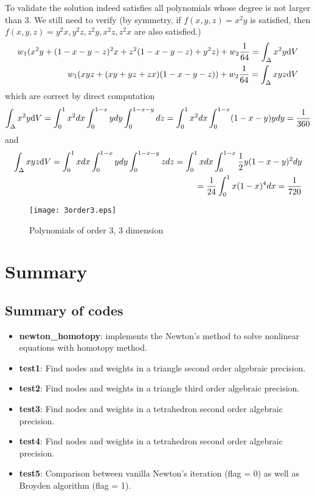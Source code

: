 \documentclass[conference,onecolumn, 12pt]{IEEEtran}
\begin{document}
To validate the solution indeed satisfies all polynomials whose degree is not larger than 3. We still need to verify (by symmetry, if $f(x,y,z)=x^2y$ is satisfied, then $f(x,y,z)=y^2x,y^2z,z^2y,x^2z,z^2x$ are also satisfied.)
\begin{equation}
    \begin{split}
        w_1(x^2y+(1-x-y-z)^2 x+z^2(1-x-y-z)+y^2z)+w_2\frac{1}{64}=\int_{\Delta} x^2y {\rm d}V\\
        w_1(xyz+(xy+yz+zx)(1-x-y-z))+w_2\frac{1}{64}=\int_{\Delta} xyz {\rm d}V
    \end{split}
\end{equation}
which are correct by direct computation
\begin{equation*}
    \int_{\Delta} x^2y {\rm d}V=\int_0^1 x^2 dx \int_0^{1-x} y dy \int_0^{1-x-y}dz = \int_0^1 x^2 dx \int_0^{1-x} (1-x-y) y dy=\frac{1}{360}
\end{equation*}
and
\begin{equation*}
    \begin{split}
        \int_{\Delta} xyz {\rm d}V=\int_0^1 x dx \int_0^{1-x} y dy \int_0^{1-x-y} zdz=\int_0^1 x dx \int_0^{1-x} \frac{1}{2}y(1-x-y)^2dy\\
        =  \frac{1}{24}  \int_0^1 x(1-x)^4 dx=\frac{1}{720}
    \end{split}
\end{equation*}
\begin{figure}[!htbp]
    \centering
    \texttt{[image: 3order3.eps]}
    \caption{Polynomials of order 3, 3 dimension}
    \label{3p3}
\end{figure}


\section{Summary}
\subsection{Summary of codes}
\begin{itemize}
    \item {\bf newton\_homotopy}: implements the Newton's method to solve nonlinear equations with homotopy method.
    \item {\bf test1}: Find nodes and weights in a triangle second order algebraic precision.
    \item {\bf test2}: Find nodes and weights in a triangle third order algebraic precision.
    \item {\bf test3}: Find nodes and weights in a tetrahedron second order algebraic precision.
    \item {\bf test4}: Find nodes and weights in a tetrahedron second order algebraic precision.
    \item {\bf test5}: Comparison between vanilla Newton's iteration (flag = 0) as well as Broyden algorithm (flag = 1).


\end{itemize}
\end{document}
